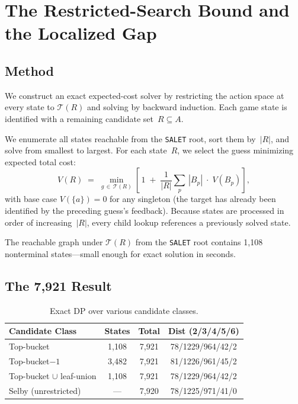 \documentclass[11pt]{article}
\begin{document}
	\section{The Restricted-Search Bound and the Localized Gap}
	\label{sec:localized}
	
	\subsection{Method}
	
	We construct an exact expected-cost solver by restricting the action space
	at every state to $\mathcal{T}(R)$ and solving by backward induction.
	Each game state is identified with a remaining candidate set~$R \subseteq A$.
	
	We enumerate all states reachable from the \texttt{SALET} root,
	sort them by~$|R|$, and solve from smallest to largest.
	For each state~$R$, we select the guess minimizing expected total cost:
	\begin{equation}\label{eq:bellman}
		V(R) \;=\; \min_{g \,\in\, \mathcal{T}(R)}
		\left[\,1 \;+\; \frac{1}{|R|}\sum_{p}\,|B_p|\;\cdot\;V(B_p)\right],
	\end{equation}
	with base case $V(\{a\}) = 0$ for any singleton (the target has already
	been identified by the preceding guess's feedback).
	Because states are processed in order of increasing~$|R|$,
	every child lookup references a previously solved state.
	
	The reachable graph under $\mathcal{T}(R)$ from the \texttt{SALET} root
	contains 1{,}108 nonterminal states---small enough for exact solution
	in seconds.
	
	\subsection{The 7,921 Result}
	
	\begin{table}[h]
		\centering
		\caption{Exact DP over various candidate classes.}
		\label{tab:dp}
		\begin{tabular}{@{}lccc@{}}
			\toprule
			Candidate Class & States & Total & Dist (2/3/4/5/6) \\
			\midrule
			Top-bucket & 1,108 & 7,921 & 78/1229/964/42/2 \\
			Top-bucket$-1$ & 3,482 & 7,921 & 81/1226/961/45/2 \\
			Top-bucket $\cup$ leaf-union & 1,108 & 7,921 & 78/1229/964/42/2 \\
			Selby (unrestricted) & --- & 7,920 & 78/1225/971/41/0 \\
			\bottomrule
		\end{tabular}
	\end{table}
	
\end{document}
